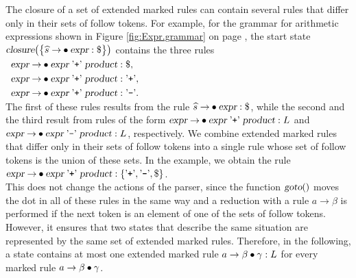 The closure of a set of extended marked rules can contain several rules that differ only in their sets of
follow tokens.  For example, for the grammar for arithmetic expressions shown in Figure \ref{fig:Expr.grammar}
on page \pageref{fig:Expr.grammar}, the start state
$\textsl{closure}\bigl(\bigl\{ \widehat{s} \rightarrow \mdot \textsl{expr}:\symbol{36}\bigr\}\bigr)$ contains
the three rules
\\[0.2cm]
\hspace*{1.3cm}
$\begin{array}[t]{l}
   \textsl{expr} \rightarrow \mdot \textsl{expr} \aquoted{+} \textsl{product}: \symbol{36}, \\[0.1cm]
   \textsl{expr} \rightarrow \mdot \textsl{expr} \aquoted{+} \textsl{product}: \saquoted{+}, \\[0.1cm]
   \textsl{expr} \rightarrow \mdot \textsl{expr} \aquoted{+} \textsl{product}: \saquoted{-}.
 \end{array}$
\\[0.2cm]
The first of these rules results from the rule $\widehat{s} \rightarrow \mdot \textsl{expr}:\symbol{36}$,
while the second and the third result from rules of the form
$\textsl{expr} \rightarrow \mdot \textsl{expr} \aquoted{+} \textsl{product}: L$ and
$\textsl{expr} \rightarrow \mdot \textsl{expr} \aquoted{-} \textsl{product}: L$, respectively.
We combine extended marked rules that differ only in their sets of follow tokens into a single rule whose set
of follow tokens is the union of these sets.  In the example, we obtain the rule
\\[0.2cm]
\hspace*{1.3cm}
$\textsl{expr} \rightarrow \mdot \textsl{expr} \aquoted{+} \textsl{product}:
 \{ \saquoted{+}, \saquoted{-}, \symbol{36} \}$.
\\[0.2cm]
This does not change the actions of the parser, since the function $\textsl{goto}()$ moves the dot in all of
these rules in the same way and a reduction with a rule $a \rightarrow \beta$ is performed if the next token
is an element of one of the sets of follow tokens.  However, it ensures that two states that describe the same
situation are represented by the same set of extended marked rules.  Therefore, in the following, a state contains
at most one extended marked rule $a \rightarrow \beta \mdot \gamma: L$ for every marked rule
$a \rightarrow \beta \mdot \gamma$.

